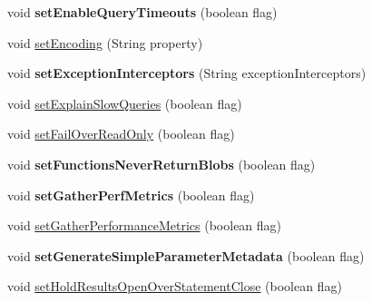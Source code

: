 \begin{DoxyCompactItemize}
\item 
\mbox{\label{classcom_1_1mysql_1_1jdbc_1_1_multi_host_my_s_q_l_connection_ab17a700cd41c2cf5af55d9419c16ffc1}} 
void {\bfseries set\+Enable\+Query\+Timeouts} (boolean flag)
\item 
void \mbox{\hyperlink{classcom_1_1mysql_1_1jdbc_1_1_multi_host_my_s_q_l_connection_ac1a500dcfbd93a1256da1104c58cfc7f}{set\+Encoding}} (String property)
\item 
\mbox{\label{classcom_1_1mysql_1_1jdbc_1_1_multi_host_my_s_q_l_connection_a5ba3d10b8a0848157c7fb8cca85cf1cf}} 
void {\bfseries set\+Exception\+Interceptors} (String exception\+Interceptors)
\item 
void \mbox{\hyperlink{classcom_1_1mysql_1_1jdbc_1_1_multi_host_my_s_q_l_connection_aae6e6a98dc0bdfbf91fd7e5eecb0e1ca}{set\+Explain\+Slow\+Queries}} (boolean flag)
\item 
void \mbox{\hyperlink{classcom_1_1mysql_1_1jdbc_1_1_multi_host_my_s_q_l_connection_a17dcc1cedd18c886c23b8afd43a22cfe}{set\+Fail\+Over\+Read\+Only}} (boolean flag)
\item 
\mbox{\label{classcom_1_1mysql_1_1jdbc_1_1_multi_host_my_s_q_l_connection_a2a7c74a7f04787a89553bdf339418e8b}} 
void {\bfseries set\+Functions\+Never\+Return\+Blobs} (boolean flag)
\item 
\mbox{\label{classcom_1_1mysql_1_1jdbc_1_1_multi_host_my_s_q_l_connection_af6b11662c92353c6e61f896cb0d2dc3c}} 
void {\bfseries set\+Gather\+Perf\+Metrics} (boolean flag)
\item 
void \mbox{\hyperlink{classcom_1_1mysql_1_1jdbc_1_1_multi_host_my_s_q_l_connection_a06b568a697c11663a400405c5c8998cb}{set\+Gather\+Performance\+Metrics}} (boolean flag)
\item 
\mbox{\label{classcom_1_1mysql_1_1jdbc_1_1_multi_host_my_s_q_l_connection_ad9cf2ae744d94d5558a1c13451415311}} 
void {\bfseries set\+Generate\+Simple\+Parameter\+Metadata} (boolean flag)
\item 
void \mbox{\hyperlink{classcom_1_1mysql_1_1jdbc_1_1_multi_host_my_s_q_l_connection_a12b7bd6460f769ac0ef7b34c7fbc9808}{set\+Hold\+Results\+Open\+Over\+Statement\+Close}} (boolean flag)

\end{DoxyCompactItemize}
